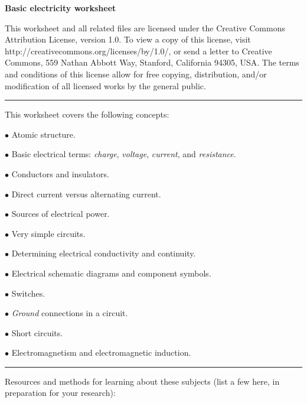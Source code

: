 
\centerline{\bf Basic electricity worksheet} \bigskip 
 
This worksheet and all related files are licensed under the Creative Commons Attribution License, version 1.0.  To view a copy of this license, visit http://creativecommons.org/licenses/by/1.0/, or send a letter to Creative Commons, 559 Nathan Abbott Way, Stanford, California 94305, USA.  The terms and conditions of this license allow for free copying, distribution, and/or modification of all licensed works by the general public.

\bigskip 

\hrule

\vskip 5pt

This worksheet covers the following concepts:

\bigskip

\item {$\bullet$} Atomic structure.
\item {$\bullet$} Basic electrical terms: {\it charge}, {\it voltage}, {\it current}, and {\it resistance}.
\item {$\bullet$} Conductors and insulators.
\item {$\bullet$} Direct current versus alternating current.
\item {$\bullet$} Sources of electrical power.
\item {$\bullet$} Very simple circuits.
\item {$\bullet$} Determining electrical conductivity and continuity.
\item {$\bullet$} Electrical schematic diagrams and component symbols.
\item {$\bullet$} Switches.
\item {$\bullet$} {\it Ground} connections in a circuit.
\item {$\bullet$} Short circuits.
\item {$\bullet$} Electromagnetism and electromagnetic induction.

\bigskip 

\hrule

\vskip 10pt

Resources and methods for learning about these subjects (list a few here, in preparation for your research):

